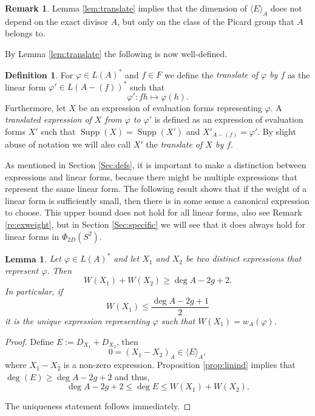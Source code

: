 \documentclass[12pt]{amsart}
\renewcommand{\leq}{\leqslant}
\renewcommand{\geq}{\geqslant}
\DeclareMathOperator{\Supp}{Supp}
\newtheorem{lemma}[theorem]{Lemma}
\theoremstyle{definition}
\newtheorem{definition}[theorem]{Definition}
\newtheorem{remark}[theorem]{Remark}
\newcommand{\divi}[1]{\langle #1 \rangle}
\begin{document}
	\begin{remark}
		Lemma \ref{lem:translate} implies that the dimension of $\divi E_A$ does not depend on the exact divisor $A$, but only on the class of the Picard group that $A$ belongs to. 
	\end{remark}
	
	By Lemma \ref{lem:translate} the following is now well-defined.  
	
	\begin{definition}
		For $\varphi \in L(A)^\ast$ and $f \in F$ we define the \textit{translate of $\varphi$ by $f$} as the linear form $\varphi' \in L(A - (f))^\ast$ such that 
		$$\varphi': fh \mapsto \varphi(h).$$ 
		Furthermore, let $X$ be an expression of evaluation forms representing $\varphi$. A \textit{translated expression of $X$ from $\varphi$ to $\varphi'$} is defined as an expression of evaluation forms $X'$ such that $\Supp(X) = \Supp(X')$ and $X'_{A - (f)} = \varphi'$. By slight abuse of notation we will also call $X'$ the \textit{translate of $X$ by $f$}. 
	\end{definition}
	
	As mentioned in Section \ref{Sec:defs}, it is important to make a distinction between expressions and linear forms, because there might be multiple expressions that represent the same linear form. The following result shows that if the weight of  a linear form is sufficiently small, then there is in some sense a canonical expression to choose. This upper bound does not hold for all linear forms, also see Remark \ref{re:exweight}, but in Section \ref{Sec:specific} we will see that it does always hold for linear forms in $\Phi_{2D}(S^2)$. 
	
	\begin{lemma}\label{lem:weightLD}
		Let $\varphi \in L(A)^\ast$ and let $X_1$ and $X_2$ be two distinct expressions that represent $\varphi$. Then 
		$$W(X_1) + W(X_2) \geq \deg A - 2g + 2.$$ 
		In particular, if $$W(X_1) \leq \frac{\deg A - 2g + 1}{2}$$ 
		it is the unique expression representing $\varphi$ such that $W(X_1) = w_A(\varphi)$. 
	\end{lemma}
	\begin{proof}
		Define $E := D_{X_1} + D_{X_2}$, then 
		$$ 0 = (X_1 - X_2)_A \in \divi E_A,$$
		where $X_1 - X_2$ is a non-zero expression. Proposition \ref{prop:linind} implies that $\deg(E) \geq \deg A - 2g + 2$ and thus, 
		$$\deg A - 2g + 2 \leq \deg E \leq W(X_1) + W(X_2).$$
		
		The uniqueness statement follows immediately. 
	\end{proof}
\end{document}
